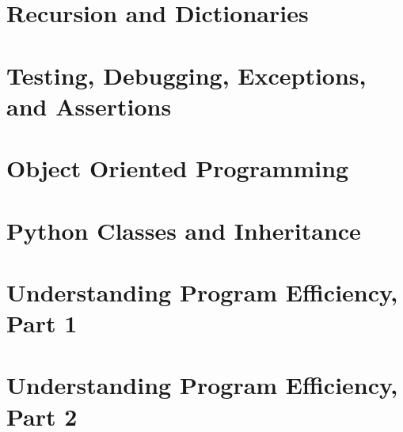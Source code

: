 \documentclass[letterpaper,12pt]{article}
\begin{document}
\section{Recursion and Dictionaries}



\section{Testing, Debugging, Exceptions, and Assertions}




\section{Object Oriented Programming}



\section{Python Classes and Inheritance}



\section{Understanding Program Efficiency, Part 1}

\section{Understanding Program Efficiency, Part 2}
\end{document}
